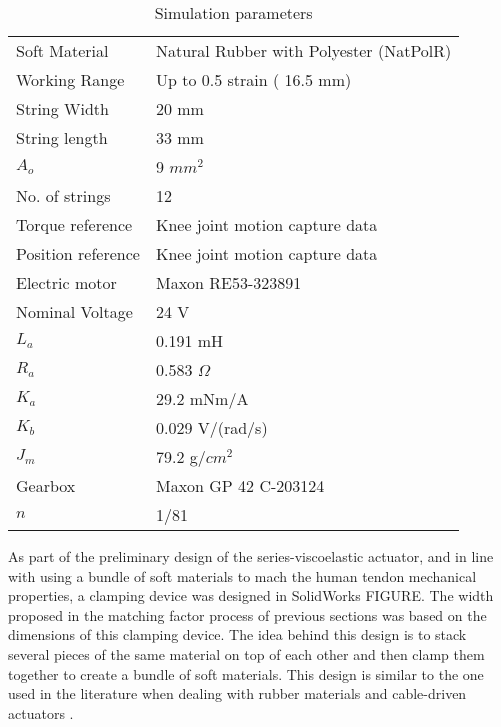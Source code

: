\begin{table}[hbtp!]
    \centering
    \caption{Simulation parameters}
    \begin{tabular}{ll}
    \toprule
    Soft Material       & Natural Rubber with Polyester (NatPolR)\\
    Working Range       & Up to 0.5 strain ( 16.5 mm)\\
    String Width        & 20 mm\\
    String length       & 33 mm\\
    $A_o$               & 9 $mm^2$\\
    No. of strings      & 12\\ 
    Torque reference    & Knee joint motion capture data \\
    Position reference  & Knee joint motion capture data \\
    \midrule
    Electric motor      & Maxon RE53-323891 \cite{Maxon2019motor}\\
    Nominal Voltage     & 24 V\\
    $L_a$               & 0.191 mH\\
    $R_a$               & 0.583 $\Omega$\\
    $K_a$               & 29.2 mNm/A\\
    $K_b$               & 0.029 V/(rad/s)\\
    $J_m$               & 79.2 g/$cm^2$\\
    \midrule
    Gearbox             & Maxon GP 42 C-203124 \cite{Maxon2019gearhead}\\
    $n$                 & 1/81\\
    \end{tabular}
    \label{tbl:simParameters}
\end{table}

As part of the preliminary design of the series-viscoelastic actuator, and in line with using a bundle of soft materials to mach the human tendon mechanical properties, a clamping device was designed in SolidWorks FIGURE. The width proposed in the matching factor process of previous sections was based on the dimensions of this clamping device. The idea behind this design is to stack several pieces of the same material on top of each other and then clamp them together to create a bundle of soft materials. This design is similar to the one used in the literature when dealing with rubber materials and cable-driven actuators \cite{austin2015control}.

